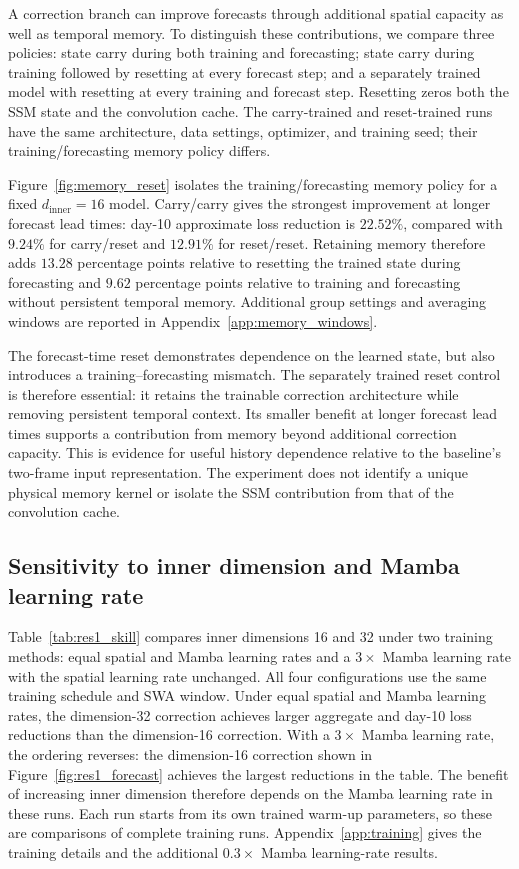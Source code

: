 \documentclass{article}
\begin{document}
A correction branch can improve forecasts through additional spatial capacity as well as temporal memory. To distinguish these contributions, we compare three policies: state carry during both training and forecasting; state carry during training followed by resetting at every forecast step; and a separately trained model with resetting at every training and forecast step. Resetting zeros both the SSM state and the convolution cache. The carry-trained and reset-trained runs have the same architecture, data settings, optimizer, and training seed; their training/forecasting memory policy differs.

Figure~\ref{fig:memory_reset} isolates the training/forecasting memory policy for a fixed $d_{\mathrm{inner}}=16$ model. Carry/carry gives the strongest improvement at longer forecast lead times: day-10 approximate loss reduction is $22.52\%$, compared with $9.24\%$ for carry/reset and $12.91\%$ for reset/reset. Retaining memory therefore adds $13.28$ percentage points relative to resetting the trained state during forecasting and $9.62$ percentage points relative to training and forecasting without persistent temporal memory. Additional group settings and averaging windows are reported in Appendix~\ref{app:memory_windows}.

The forecast-time reset demonstrates dependence on the learned state, but also introduces a training--forecasting mismatch. The separately trained reset control is therefore essential: it retains the trainable correction architecture while removing persistent temporal context. Its smaller benefit at longer forecast lead times supports a contribution from memory beyond additional correction capacity. This is evidence for useful history dependence relative to the baseline's two-frame input representation. The experiment does not identify a unique physical memory kernel or isolate the SSM contribution from that of the convolution cache.

\subsection{Sensitivity to inner dimension and Mamba learning rate}
\label{sec:training_sensitivity}
Table~\ref{tab:res1_skill} compares inner dimensions 16 and 32 under two training methods: equal spatial and Mamba learning rates and a $3\times$ Mamba learning rate with the spatial learning rate unchanged. All four configurations use the same training schedule and SWA window. Under equal spatial and Mamba learning rates, the dimension-32 correction achieves larger aggregate and day-10 loss reductions than the dimension-16 correction. With a $3\times$ Mamba learning rate, the ordering reverses: the dimension-16 correction shown in Figure~\ref{fig:res1_forecast} achieves the largest reductions in the table. The benefit of increasing inner dimension therefore depends on the Mamba learning rate in these runs. Each run starts from its own trained warm-up parameters, so these are comparisons of complete training runs. Appendix~\ref{app:training} gives the training details and the additional $0.3\times$ Mamba learning-rate results.
\end{document}
